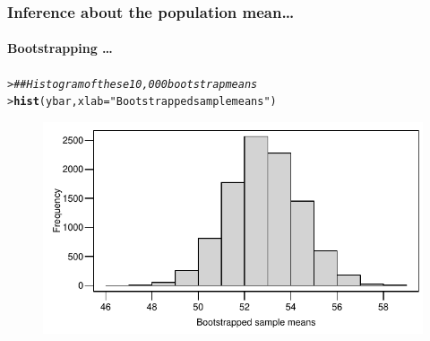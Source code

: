 \documentclass{beamer}\usepackage[]{graphicx}\usepackage[]{xcolor}
\makeatletter
\newcommand{\hlstr}[1]{\textcolor[rgb]{0.192,0.494,0.8}{#1}}%
\newcommand{\hlcom}[1]{\textcolor[rgb]{0.678,0.584,0.686}{\textit{#1}}}%
\newcommand{\hlstd}[1]{\textcolor[rgb]{0.345,0.345,0.345}{#1}}%
\newcommand{\hlkwc}[1]{\textcolor[rgb]{0.333,0.667,0.333}{#1}}%
\newcommand{\hlkwd}[1]{\textcolor[rgb]{0.737,0.353,0.396}{\textbf{#1}}}%
\newenvironment{kframe}{%
 \def\at@end@of@kframe{}%
 \ifinner\ifhmode%
  \def\at@end@of@kframe{\end{minipage}}%
  \begin{minipage}{\columnwidth}%
 \fi\fi%
 \def\FrameCommand##1{\hskip\@totalleftmargin \hskip-\fboxsep
 \colorbox{shadecolor}{##1}\hskip-\fboxsep
     \hskip-\linewidth \hskip-\@totalleftmargin \hskip\columnwidth}%
 \MakeFramed {\advance\hsize-\width
   \@totalleftmargin\z@ \linewidth\hsize
   \@setminipage}}%
 {\par\unskip\endMakeFramed%
 \at@end@of@kframe}
\newenvironment{knitrout}{}{} %
\makeatother
\begin{document}
\begin{frame}[fragile]
\frametitle{Inference about the population mean\ldots}
\framesubtitle{Bootstrapping \ldots}
\vspace{3mm}
\begin{knitrout}\scriptsize
{}\color{fgcolor}\begin{kframe}
\begin{alltt}
\hlstd{> }\hlcom{## Histogram of these 10,000 bootstrap means}
\hlstd{> }\hlkwd{hist}\hlstd{(ybar,}\hlkwc{xlab}\hlstd{=}\hlstr{"Bootstrapped sample means"}\hlstd{)}
\end{alltt}
\end{kframe}
\end{knitrout}



\begin{figure}
  \centering
  \includegraphics{figure/RC-H03-008}
\end{figure}

\end{frame}
\end{document}
